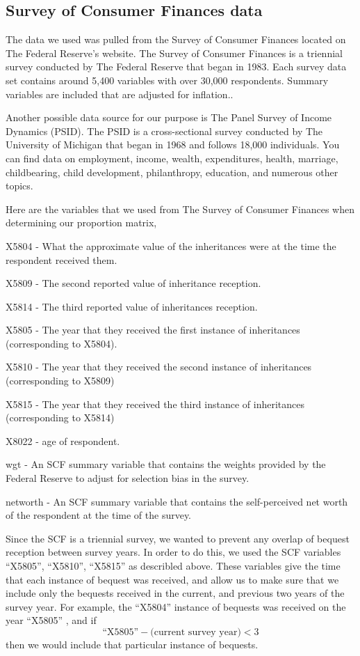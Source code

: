 \documentclass[letterpaper,12pt]{article}
\newcommand{\quotes}[1]{``#1''}
\theoremstyle{definition}
\begin{document}
\begin{spacing}{1.5}
\section{Survey of Consumer Finances data}\label{SecSCFdata}


The data we used was pulled from the Survey of Consumer Finances located on The Federal Reserve’s website. The Survey of Consumer Finances is a triennial survey conducted by The Federal Reserve that began in 1983. Each survey data set contains around 5,400 variables with over 30,000 respondents. Summary variables are included that are adjusted for inflation.\citet{FED}.

Another possible data source for our purpose is The Panel Survey of Income Dynamics (PSID). The PSID is a cross-sectional survey conducted by The University of Michigan that began in 1968 and follows 18,000 individuals. You can find data on employment, income, wealth, expenditures, health, marriage, childbearing, child development, philanthropy, education, and numerous other topics. \citet{UMich}

Here are the variables that we used from The Survey of Consumer Finances when determining our proportion matrix,

X5804 - What the approximate value of the inheritances were at the time the respondent received them. 

X5809 - The second reported value of inheritance reception.

X5814 - The third reported value of inheritances reception.

X5805 - The year that they received the first instance of inheritances (corresponding to X5804).

X5810 - The year that they received the second instance of inheritances (corresponding to X5809)

X5815 - The year that they received the third instance of inheritances (corresponding to X5814)

X8022 - age of respondent.

wgt - An SCF summary variable that contains the weights provided by the Federal Reserve to adjust for selection bias in the survey.

networth - An SCF summary variable that contains the self-perceived net worth of the respondent at the time of the survey. 


Since the SCF is a triennial survey, we wanted to prevent any overlap of bequest reception between survey years. In order to do this, we used the SCF variables \quotes{X5805}, \quotes{X5810}, \quotes{X5815} as describled above. These variables give the time that each instance of bequest was received, and allow us to make sure that we include only the bequests received in the current, and previous two years of the survey year. For example, the \quotes{X5804} instance of bequests was received on the year \quotes{X5805} , and if 
\[\text{\quotes{X5805}} - \text{(current~survey~year)} <3\]
 then we would include that particular instance of bequests.


\end{spacing}
\end{document}

